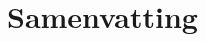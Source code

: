 \documentclass[\home/main.tex]{subfiles}
\begin{document}
\chapter{Samenvatting}

\begin{otherlanguage}{dutch}

\Blindtext

\end{otherlanguage}
\end{document}
